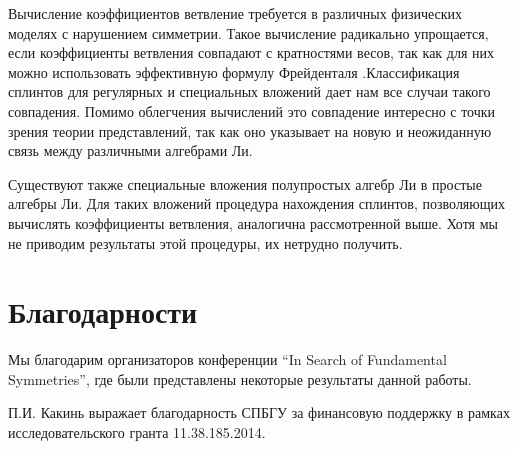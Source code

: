 \documentclass[12pt]{article}
\begin{document}
Вычисление коэффициентов ветвление требуется в различных физических моделях с нарушением симметрии.
Такое вычисление радикально упрощается, если коэффициенты ветвления совпадают с кратностями весов,
так как для них можно использовать эффективную формулу Фрейденталя
\cite{moody1982fast}.Классификация сплинтов для регулярных и специальных вложений дает нам все
случаи такого совпадения. Помимо облегчения вычислений это совпадение интересно с точки зрения
теории представлений, так как оно указывает на новую и неожиданную связь между различными алгебрами Ли. 

Существуют также специальные вложения полупростых алгебр Ли в простые алгебры Ли. Для таких вложений
процедура нахождения сплинтов, позволяющих вычислять коэффициенты ветвления, аналогична
рассмотренной выше. Хотя мы не приводим результаты этой процедуры, их нетрудно получить.

\section*{Благодарности}
\label{sec:acknowledgements}

Мы благодарим организаторов конференции ``In Search of Fundamental Symmetries'', где были
представлены некоторые результаты данной работы. 

П.И. Какинь выражает благодарность СПБГУ за финансовую поддержку в рамках исследовательского гранта  11.38.185.2014.

{} 

\end{document}
